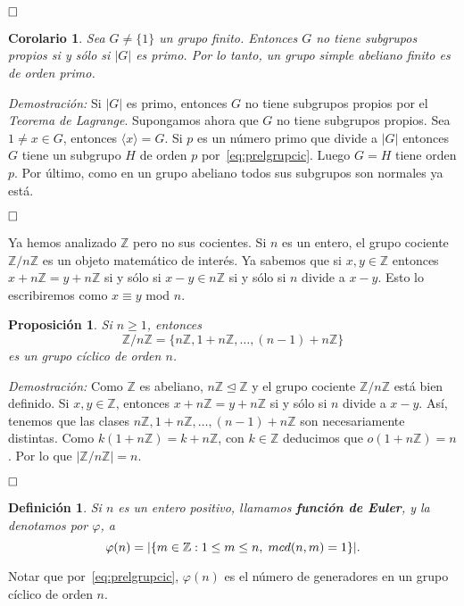 \documentclass[12pt]{article}
\newtheorem{proposition}[theorem]{Proposición}
\newtheorem{definition}[theorem]{Definición}
\newtheorem{corolario}{Corolario}[theorem]
\begin{document}
$\hfill \square$

\begin{corolario}\label{eq:abSimple} Sea $G \neq \lbrace 1 \rbrace$ un grupo finito. Entonces $G$ no tiene subgrupos propios si y sólo si $|G|$ es primo. Por lo tanto, un grupo simple abeliano finito es de orden primo.
\end{corolario}
\emph{Demostración: }Si $|G|$ es primo, entonces $G$ no tiene subgrupos propios por el \textit{Teorema de Lagrange}. Supongamos ahora que $G$ no tiene subgrupos propios. Sea $1 \neq x \in G$, entonces $\langle x \rangle = G$. Si $p$ es un número primo que divide a $|G|$ entonces $G$ tiene un subgrupo $H$ de orden $p$ por~\ref{eq:prelgrupcic}. Luego $G = H$ tiene orden $p$. Por último, como en un grupo abeliano todos sus subgrupos son normales ya está.

$\hfill \square$

Ya hemos analizado $\mathbb{Z}$ pero no sus cocientes. Si $n$ es un entero, el grupo cociente $\mathbb{Z}/n\mathbb{Z}$ es un objeto matemático de interés. Ya sabemos que si $x,y \in \mathbb{Z}$ entonces $x+n\mathbb{Z} = y + n\mathbb{Z}$ si y sólo si $x-y \in n\mathbb{Z}$ si y sólo si $n$ divide a $x-y$. Esto lo escribiremos como $x \equiv y$ mod $n$.

\begin{proposition}Si $n \geq 1$, entonces $$\mathbb{Z}/n\mathbb{Z} = \lbrace n\mathbb{Z}, 1+n\mathbb{Z}, \ldots, (n-1)+n\mathbb{Z} \rbrace$$ es un grupo cíclico de orden $n$.
\end{proposition}
\emph{Demostración: }Como $\mathbb{Z}$ es abeliano, $n\mathbb{Z} \unlhd \mathbb{Z}$ y el grupo cociente $\mathbb{Z}/n\mathbb{Z}$ está bien definido. Si $x,y \in \mathbb{Z}$, entonces $x +n\mathbb{Z} = y + n\mathbb{Z}$ si y sólo si $n$ divide a $x-y$. Así, tenemos que las clases $n\mathbb{Z}, 1+n\mathbb{Z}, \ldots, (n-1) +n\mathbb{Z}$ son necesariamente distintas. Como $k(1+n\mathbb{Z}) = k + n\mathbb{Z}$, con $k \in \mathbb{Z}$ deducimos que $o(1+n\mathbb{Z})=n$. Por lo que $|\mathbb{Z}/n\mathbb{Z}| = n$.

$\hfill \square$

\begin{definition}Si $n$ es un entero positivo, llamamos \textbf{función de Euler}, y la denotamos por $\varphi$, a $$\varphi(n)=| \lbrace m \in \mathbb{Z}:1\leq m \leq n, \hspace{0.1cm} mcd(n,m)=1 \rbrace|.$$
\end{definition}

Notar que por~\ref{eq:prelgrupcic}, $\varphi(n)$ es el número de generadores en un grupo cíclico de orden $n$.
\end{document}
